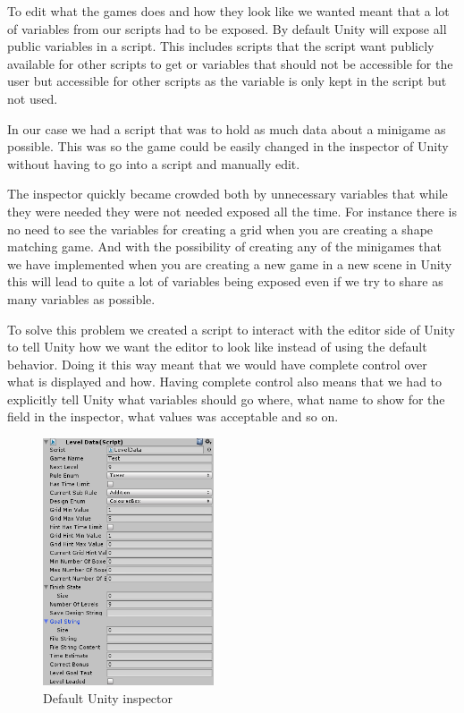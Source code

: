 To edit what the games does and how they look like we wanted meant that a lot of variables from our scripts had to be exposed.
By default Unity will expose all public variables in a script.
This includes scripts that the script want publicly available for other scripts to get or variables that should not be accessible for the
user but accessible for other scripts as the variable is only kept in the script but not used.

In our case we had a script that was to hold as much data about a minigame as possible.
This was so the game could be easily changed in the inspector of Unity without having to go into a script and manually edit.

The inspector quickly became crowded both by unnecessary variables that while they were needed they were not needed exposed all the time.
For instance there is no need to see the variables for creating a grid when you are creating a shape matching game.
And with the possibility of creating any of the minigames that we have implemented when you are creating a new game in a new scene in Unity 
this will lead to quite a lot of variables being exposed even if we try to share as many variables as possible.

To solve this problem we created a script to interact with the editor side of Unity to tell Unity how we
want the editor to look like instead of using the default behavior.
Doing it this way meant that we would have complete control over what is displayed and how.
Having complete control also means that we had to explicitly tell Unity what variables should go where, what name to show
for the field in the inspector, what values was acceptable and so on. 

\begin{figure}
	\capstart
	\includegraphics[width=0.45\textwidth]{images/inspector.png}
	\caption{Default Unity inspector}
\end{figure}

